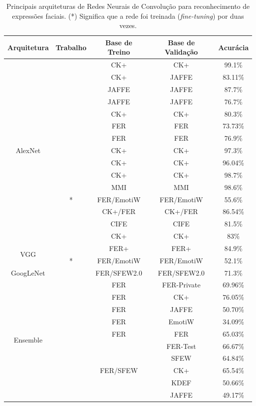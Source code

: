 \begin{table}[]
\centering
\caption{Principais arquiteturas de Redes Neurais de Convolução para reconhecimento de expressões faciais. (*) Significa que a rede foi treinada (\emph{fine-tuning}) por duas vezes.}
\label{my-label}
\begin{tabular}{|c|c|c|c|c|}
\hline
\textbf{Arquitetura} & \textbf{Trabalho} & \textbf{Base de Treino} & \textbf{Base de Validação} & \textbf{Acurácia} \\ \hline
\multirow{15}{*}{AlexNet} & \multirow{3}{*}{\cite{art1}} & CK+ & CK+ & 99.1\% \\ \cline{3-5} 
 &  & CK+ & JAFFE & 83.11\% \\ \cline{3-5} 
 &  & JAFFE & JAFFE & 87.7\% \\ \cline{2-5} 
 & \multirow{2}{*}{\cite{art2}} & JAFFE & JAFFE & 76.7\% \\ \cline{3-5} 
 &  & CK+ & CK+ & 80.3\% \\ \cline{2-5} 
 & \cite{art4} & FER & FER & 73.73\% \\ \cline{2-5} 
 & \multirow{2}{*}{\cite{art7}} & FER & FER & 76.9\% \\ \cline{3-5} 
 &  & CK+ & CK+ & 97.3\% \\ \cline{2-5} 
 & \cite{art9} & CK+ & CK+ & 96.04\% \\ \cline{2-5} 
 & \multirow{2}{*}{\cite{art11}} & CK+ & CK+ & 98.7\% \\ \cline{3-5} 
 &  & MMI & MMI & 98.6\% \\ \cline{2-5} 
 & \cite{art13}* & FER/EmotiW & FER/EmotiW & 55.6\% \\ \cline{2-5} 
 & \cite{art14} & CK+/FER & CK+/FER & 86.54\% \\ \cline{2-5} 
 & \multirow{2}{*}{\cite{art15}} & CIFE & CIFE & 81.5\% \\ \cline{3-5} 
 &  & CK+ & CK+ & 83\% \\ \hline
\multirow{2}{*}{VGG} & \cite{art8} & FER+ & FER+ & 84.9\% \\ \cline{2-5} 
 & \cite{art13}* & FER/EmotiW & FER/EmotiW & 52.1\% \\ \hline
GoogLeNet & \cite{art10} & FER/SFEW2.0 & FER/SFEW2.0 & 71.3\% \\ \hline
\multirow{10}{*}{Ensemble} & \multirow{4}{*}{\cite{art3}} & FER & FER-Private & 69.96\% \\ \cline{3-5} 
 &  & FER & CK+ & 76.05\% \\ \cline{3-5} 
 &  & FER & JAFFE & 50.70\% \\ \cline{3-5} 
 &  & FER & EmotiW & 34.09\% \\ \cline{2-5} 
 & \cite{art5} & FER & FER & 65.03\% \\ \cline{2-5} 
 & \multirow{5}{*}{\cite{art6}} & \multirow{5}{*}{FER/SFEW} & FER-Test & 66.67\% \\ \cline{4-5} 
 &  &  & SFEW & 64.84\% \\ \cline{4-5} 
 &  &  & CK+ & 65.54\% \\ \cline{4-5} 
 &  &  & KDEF & 50.66\% \\ \cline{4-5} 
 &  &  & JAFFE & 49.17\% \\ \hline
\end{tabular}
\end{table}
